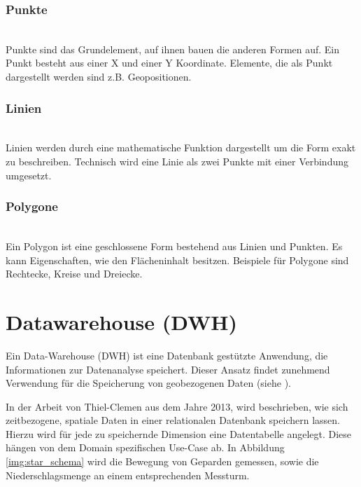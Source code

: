 \documentclass[10pt,conference,compsocconf]{IEEEtran}
\begin{document}
\subsubsection{Punkte}\hspace*{\fill} \\
Punkte sind das Grundelement, auf ihnen bauen die anderen Formen auf. Ein Punkt besteht aus einer X und einer Y Koordinate. Elemente, die als Punkt dargestellt werden sind z.B. Geopositionen.\vspace{.5em}

\subsubsection{Linien}\hspace*{\fill} \\
Linien werden durch eine mathematische Funktion dargestellt um die Form exakt zu beschreiben. Technisch wird eine Linie als zwei Punkte mit einer Verbindung umgesetzt.\vspace{.5em}

\subsubsection{Polygone}\hspace*{\fill} \\
Ein Polygon ist eine geschlossene Form bestehend aus Linien und Punkten. Es kann Eigenschaften, wie den Flächeninhalt besitzen. Beispiele für Polygone sind Rechtecke, Kreise und Dreiecke.


\section{Datawarehouse (DWH)}
Ein Data-Warehouse (DWH) ist eine Datenbank gestützte Anwendung, die Informationen zur Datenanalyse speichert. Dieser Ansatz findet zunehmend Verwendung für die Speicherung von geobezogenen Daten (siehe \cite{Kelling2009} \cite{McGuire2008} \cite{olap}).\par

In der Arbeit von Thiel-Clemen\cite{ThielClemen2013} aus dem Jahre 2013, wird beschrieben, wie sich zeitbezogene, spatiale Daten in einer relationalen Datenbank speichern lassen.\\
Hierzu wird für jede zu speichernde Dimension eine Datentabelle angelegt. Diese hängen von dem Domain spezifischen Use-Case ab. In Abbildung \ref{img:star_schema} wird die Bewegung von Geparden gemessen, sowie die Niederschlagsmenge an einem entsprechenden Messturm.
\end{document}
